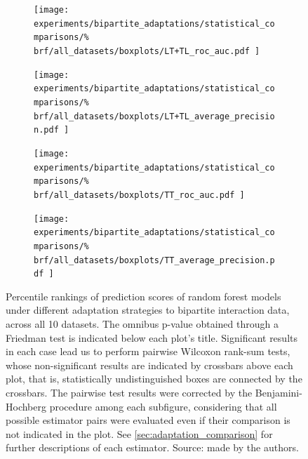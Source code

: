 \begin{figure}[tbh]
    \centering
    \begin{subfigure}{0.49\textwidth}
        \texttt{[image: 
            experiments/bipartite\_adaptations/statistical\_comparisons/\%
            brf/all\_datasets/boxplots/LT+TL\_roc\_auc.pdf
        ]}
    \end{subfigure}
    \begin{subfigure}{0.49\textwidth}
        \texttt{[image: 
            experiments/bipartite\_adaptations/statistical\_comparisons/\%
            brf/all\_datasets/boxplots/LT+TL\_average\_precision.pdf
        ]}
    \end{subfigure}

    \begin{subfigure}{0.49\textwidth}
        \texttt{[image: 
            experiments/bipartite\_adaptations/statistical\_comparisons/\%
            brf/all\_datasets/boxplots/TT\_roc\_auc.pdf
        ]}
    \end{subfigure}
    \begin{subfigure}{0.49\textwidth}
        \texttt{[image: 
            experiments/bipartite\_adaptations/statistical\_comparisons/\%
            brf/all\_datasets/boxplots/TT\_average\_precision.pdf
        ]}
    \end{subfigure}
    \caption{
        Percentile rankings of prediction scores of random forest models under different adaptation strategies to bipartite interaction data, across all 10 datasets.
        The omnibus p-value obtained through a Friedman test is indicated below each plot's title. Significant results in each case lead us to perform pairwise Wilcoxon rank-sum tests, whose non-significant results are indicated by crossbars above each plot, that is, statistically undistinguished boxes are connected by the crossbars. The pairwise test results were corrected by the Benjamini-Hochberg procedure among each subfigure, considering that all possible estimator pairs were evaluated even if their comparison is not indicated in the plot. See \autoref{sec:adaptation_comparison} for further descriptions of each estimator. Source: made by the authors.
    }
    \label{fig:adaptations_brf}
\end{figure}


